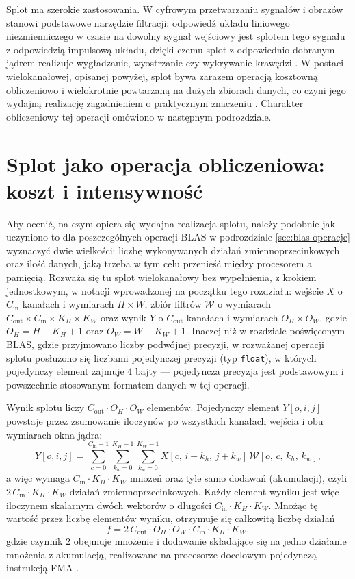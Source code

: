\documentclass[a4paper,12pt]{book} %
\begin{document}
Splot ma szerokie zastosowania. W cyfrowym przetwarzaniu sygnałów i obrazów stanowi podstawowe narzędzie filtracji: odpowiedź układu liniowego niezmienniczego w czasie na dowolny sygnał wejściowy jest splotem tego sygnału z odpowiedzią impulsową układu, dzięki czemu splot z odpowiednio dobranym jądrem realizuje wygładzanie, wyostrzanie czy wykrywanie krawędzi \cite{oppenheim2010dtsp}. W postaci wielokanałowej, opisanej powyżej, splot bywa zarazem operacją kosztowną obliczeniowo i wielokrotnie powtarzaną na dużych zbiorach danych, co czyni jego wydajną realizację zagadnieniem o praktycznym znaczeniu \cite{vasudevan2017mcmk}. Charakter obliczeniowy tej operacji omówiono w następnym podrozdziale.

\section{Splot jako operacja obliczeniowa: koszt i intensywność}
\label{sec:splot-koszt}

Aby ocenić, na czym opiera się wydajna realizacja splotu, należy podobnie jak uczyniono to dla poszczególnych operacji BLAS w podrozdziale \ref{sec:blas-operacje} wyznaczyć dwie wielkości: liczbę wykonywanych działań zmiennoprzecinkowych oraz ilość danych, jaką trzeba w tym celu przenieść między procesorem a pamięcią. Rozważa się tu splot wielokanałowy bez wypełnienia, z krokiem jednostkowym, w notacji wprowadzonej na początku tego rozdziału: wejście $X$ o $C_{\mathrm{in}}$ kanałach i wymiarach $H \times W$, zbiór filtrów $\mathcal{W}$ o wymiarach $C_{\mathrm{out}} \times C_{\mathrm{in}} \times K_H \times K_W$ oraz wynik $Y$ o $C_{\mathrm{out}}$ kanałach i wymiarach $O_H \times O_W$, gdzie $O_H = H - K_H + 1$ oraz $O_W = W - K_W + 1$. Inaczej niż w rozdziale poświęconym BLAS, gdzie przyjmowano liczby podwójnej precyzji, w rozważanej operacji splotu posłużono się liczbami pojedynczej precyzji (typ \texttt{float}), w których pojedynczy element zajmuje 4 bajty --- pojedyncza precyzja jest podstawowym i powszechnie stosowanym formatem danych w tej operacji.

Wynik splotu liczy $C_{\mathrm{out}} \cdot O_H \cdot O_W$ elementów. Pojedynczy element $Y[o, i, j]$ powstaje przez zsumowanie iloczynów po wszystkich kanałach wejścia i obu wymiarach okna jądra:
\[
  Y[o, i, j] = \sum_{c=0}^{C_{\mathrm{in}}-1} \sum_{k_h=0}^{K_H-1} \sum_{k_w=0}^{K_W-1}
  X[c,\, i + k_h,\, j + k_w]\, \mathcal{W}[o,\, c,\, k_h,\, k_w],
\]
a więc wymaga $C_{\mathrm{in}} \cdot K_H \cdot K_W$ mnożeń oraz tyle samo dodawań (akumulacji), czyli $2\,C_{\mathrm{in}} \cdot K_H \cdot K_W$ działań zmiennoprzecinkowych. Każdy element wyniku jest więc iloczynem skalarnym dwóch wektorów o długości $C_{\mathrm{in}} \cdot K_H \cdot K_W$. Mnożąc tę wartość przez liczbę elementów wyniku, otrzymuje się całkowitą liczbę działań
\[
  f = 2\, C_{\mathrm{out}} \cdot O_H \cdot O_W \cdot C_{\mathrm{in}} \cdot K_H \cdot K_W ,
\]
gdzie czynnik $2$ obejmuje mnożenie i dodawanie składające się na jedno działanie mnożenia z akumulacją, realizowane na procesorze docelowym pojedynczą instrukcją FMA \cite{vasudevan2017mcmk,georganas2018conv}.
\end{document}
